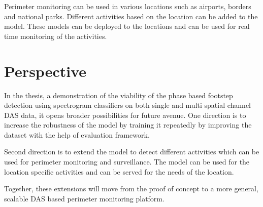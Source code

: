 Perimeter monitoring can be used in various locations such as airports, borders and national parks. Different activities based on the location can be added to the model. These models can be deployed to the locations and can be used for real time monitoring of the activities. 

\section{Perspective}
In the thesis, a demonstration of the viability of the phase based footstep detection using spectrogram classifiers on both single and multi spatial channel DAS data, it opens broader possibilities for future avenue. One direction is to increase the robustness of the model by training it repeatedly by improving the dataset with the help of evaluation framework.

Second direction is to extend the model to detect different activities which can be used for perimeter monitoring and surveillance. The model can be used for the location specific activities and can be served for the needs of the location.

Together, these extensions will move from the proof of concept to a more general, scalable DAS based perimeter monitoring platform.
